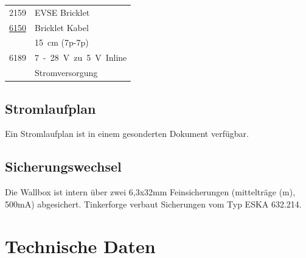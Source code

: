 \documentclass[a4paper,10pt]{article}
\begin{document}
\begin{multicols*}{2}
\begin{tabular}{ll}
		\cmidrule(lr{0.5em}){1-2}
		2159                                                                                                                     & EVSE Bricklet                                                 \\
		\cmidrule(lr{0.5em}){1-2}
		\href{https://www.tinkerforge.com/de/shop/accessories/cable/bricklet-cable-15cm-7p-7p.html}{6150}                        & Bricklet Kabel                                                \\
		                                                                                                                         & \SI{15}{\centi\meter} (7p-7p)                                 \\
		\cmidrule(lr{0.5em}){1-2}
		6189                                                                                                                     & \SI{7} - \SI{28}{\volt} zu \SI{5}{\volt} Inline               \\
		                                                                                                                         & Stromversorgung                                               \\
	\end{tabular}

	\subsection{Stromlaufplan}
	Ein Stromlaufplan ist in einem gesonderten Dokument verfügbar.

	\subsection{Sicherungswechsel}
	Die Wallbox ist intern über zwei 6,3x32mm Feinsicherungen (mittelträge (m), 500mA) abgesichert.
	Tinkerforge verbaut Sicherungen vom Typ \glqq ESKA  632.214\grqq.

	\section{Technische Daten}

	\begin{minipage}{\linewidth}


\end{minipage}
\end{multicols*}
\end{document}
